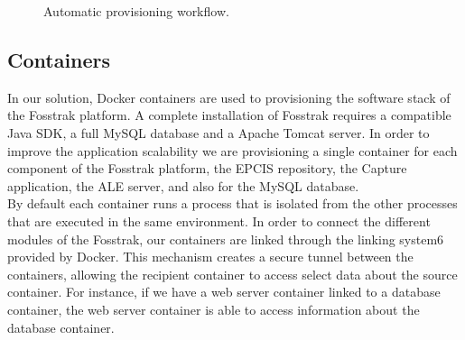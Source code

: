 \begin{figure}[!ht]
  \centering
  \caption{Automatic provisioning workflow.}
  \label{fig:c4t_tech_architecture}
\end{figure}

\subsection{Containers}
\label{sub:impl_containers}
In our solution, Docker containers are used to provisioning the software stack of the Fosstrak platform.
A complete installation of Fosstrak requires a compatible Java SDK, a full MySQL database and a Apache
Tomcat server. In order to improve the application scalability we are provisioning a single container
for each component of the Fosstrak platform, the EPCIS repository, the Capture application, the ALE
server, and also for the MySQL database.\\

By default each container runs a process that is isolated from the other processes that are executed
in the same environment. In order to connect the different modules of the Fosstrak, our containers are
linked through the linking system6 provided by Docker. This mechanism creates a secure tunnel between the
containers, allowing the recipient container to access select data about the source container. For instance,
if we have a web server container linked to a database container, the web server container is able to access
information about the database container.\\

